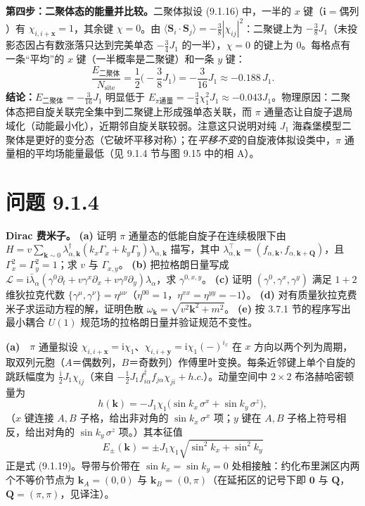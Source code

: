 \textbf{第四步：二聚体态的能量并比较。}二聚体拟设 (9.1.16) 中，一半的 $x$ 键（$\pmb{i}=\text{偶列}$）有 $\chi_{i,i+\pmb{x}}=1$，其余键 $\chi=0$。由 $\langle\pmb{S}_i\cdot\pmb{S}_j\rangle=-\frac38|\chi_{ij}|^2$：二聚键上为 $-\frac38J_1$（未投影态因占有数涨落只达到完美单态 $-\frac34J_1$ 的一半），$\chi=0$ 的键上为 $0$。每格点有一条“平均”的 $x$ 键（一半概率是二聚键）和一条 $y$ 键：
\begin{equation*}
\frac{E_{\text{二聚体}}}{N_{\text{site}}}
=\frac12\Big(-\frac38J_1\Big)=-\frac{3}{16}J_1\approx-0.188\,J_1 .
\end{equation*}
\textbf{结论：}$E_{\text{二聚体}}=-\frac{3}{16}J_1$ 明显低于 $E_{\pi\text{通量}}=-\frac34\chi_1^2J_1\approx-0.043J_1$。物理原因：二聚体态把自旋关联完全集中到二聚键上形成强单态关联，而 $\pi$ 通量态让自旋子退局域化（动能最小化），近期邻自旋关联较弱。注意这只说明对纯 $J_1$ 海森堡模型二聚体是更好的变分态（它破坏平移对称）；在\emph{平移不变}的自旋液体拟设类中，$\pi$ 通量相的平均场能量最低（见 9.1.4 节与图 9.15 中的相 A）。

\section*{问题 9.1.4}
\begin{problem}
\textbf{Dirac 费米子。}
\textbf{(a)} 证明 $\pi$ 通量态的低能自旋子在连续极限下由 $H=v\sum_{\pmb{k}\sim0}\lambda^{\dagger}_{\alpha,\pmb{k}}(k_x\Gamma_x+k_y\Gamma_y)\lambda_{\alpha,\pmb{k}}$ 描写，其中 $\lambda^{\top}_{\alpha,\pmb{k}}=(f_{\alpha,\pmb{k}},f_{\alpha,\pmb{k}+\pmb{Q}})$，且 $\Gamma_x^2=\Gamma_y^2=1$；求 $v$ 与 $\Gamma_{x,y}$。
\textbf{(b)} 把拉格朗日量写成 $\mathcal{L}=\mathrm{i}\bar{\lambda}_{\alpha}(\gamma^0\partial_t+v\gamma^x\partial_x+v\gamma^y\partial_y)\lambda_{\alpha}$，求 $\gamma^{0,x,y}$。
\textbf{(c)} 证明 $(\gamma^0,\gamma^x,\gamma^y)$ 满足 $1+2$ 维狄拉克代数 $\{\gamma^{\mu},\gamma^{\nu}\}=\eta^{\mu\nu}$（$\eta^{00}=1$，$\eta^{xx}=\eta^{yy}=-1$）。
\textbf{(d)} 对有质量狄拉克费米子求运动方程的解，证明色散 $\omega_{\pmb{k}}=\sqrt{v^2\pmb{k}^2+m^2}$。
\textbf{(e)} 按 3.7.1 节的程序写出最小耦合 $U(1)$ 规范场的拉格朗日量并验证规范不变性。
\end{problem}
\solution
\textbf{(a)}　$\pi$ 通量拟设 $\chi_{i,i+\pmb{x}}=\mathrm{i}\chi_1$、$\chi_{i,i+\pmb{y}}=\mathrm{i}\chi_1(-)^{i_x}$ 在 $x$ 方向以两个列为周期，取双列元胞（$A$＝偶数列，$B$＝奇数列）作傅里叶变换。每条近邻键上单个自旋的跳跃幅度为 $\frac{\mathrm{i}}{2}J_1\chi_{ij}$（来自 $-\frac12J_1 f^{\dagger}_{i\alpha}f_{j\alpha}\chi_{ji}+h.c.$）。动量空间中 $2\times2$ 布洛赫哈密顿量为
\begin{equation*}
h(\pmb{k})=-J_1\chi_1\big(\sin k_x\,\sigma^x+\sin k_y\,\sigma^z\big),
\end{equation*}
（$x$ 键连接 $A,B$ 子格，给出非对角的 $\sin k_x\,\sigma^x$ 项；$y$ 键在 $A,B$ 子格上符号相反，给出对角的 $\sin k_y\,\sigma^z$ 项。）其本征值
\begin{equation*}
E_{\pm}(\pmb{k})=\pm J_1\chi_1\sqrt{\sin^2k_x+\sin^2k_y}
\end{equation*}
正是式 (9.1.19)。导带与价带在 $\sin k_x=\sin k_y=0$ 处相接触：约化布里渊区内两个不等价节点为 $\pmb{k}_A=(0,0)$ 与 $\pmb{k}_B=(0,\pi)$（在延拓区的记号下即 $\pmb{0}$ 与 $\pmb{Q}$，$\pmb{Q}=(\pi,\pi)$，见译注）。

